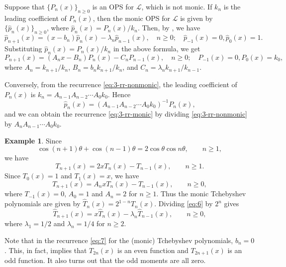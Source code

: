 \documentclass{amsart}
\numberwithin{equation}{section}
\theoremstyle{definition}
\newtheorem{exam}[thm]{Example}
\newcommand\LL{\mathcal{L}}
\begin{document}
Suppose that \( \{ P_n(x) \}_{n\ge 0} \) is an OPS for \( \LL \),
which is not monic. If \( k_n \) is the leading coefficient of
\( P_n(x) \), then the monic OPS for \( \LL \) is given by
\( \{ \hat{p}_n(x) \}_{n\ge 0} \), where
\( \hat{p}_n(x) = P_n(x)/k_n \).
Then, by , we have
\begin{equation}\label{eq:3-rr-monic}
  \hat{p}_{n+1}(x) = (x-b_n) \hat{p}_n(x) - \lambda_n
  \hat{p}_{n-1}(x), \quad n\ge0; \quad \hat{p}_{-1}(x) = 0, \hat{p}_{0}(x) = 1.
\end{equation}
Substituting \( \hat{p}_n(x) = P_n(x)/k_n \) in the above formula, we get
\begin{equation}\label{eq:3-rr-nonmonic}
  P_{n+1}(x) = (A_nx-B_n) P_n(x) - C_n P_{n-1}(x), \quad n\ge0; \quad P_{-1}(x) = 0, P_{0}(x) = k_0,
\end{equation}
where \( A_n = k_{n+1}/k_n \), \( B_n = b_nk_{n+1}/k_n \), and
\( C_n = \lambda_nk_{n+1}/k_{n-1} \).

Conversely, from the recurrence \eqref{eq:3-rr-nonmonic}, the leading
coefficient of \( P_n(x) \) is
\( k_n = A_{n-1}A_{n-2} \cdots A_0 k_0 \). Hence
\[
  \hat{p}_n(x) = (A_{n-1}A_{n-2} \cdots A_0 k_0)^{-1} P_n(x),
\]
and we can obtain the recurrence \eqref{eq:3-rr-monic} by dividing
\eqref{eq:3-rr-nonmonic} by \( A_{n}A_{n-1} \cdots A_0 k_0 \).

\begin{exam}
  Since
  \[
    \cos(n+1)\theta + \cos(n-1)\theta
    = 2 \cos\theta \cos n\theta, \qquad n\ge1,
  \]
  we have
  \[
    T_{n+1}(x) = 2 x T_n(x) - T_{n-1}(x) , \qquad n\ge1.
  \]
  Since \( T_{0}(x)=1 \) and \( T_{1}(x)=x \), we have
  \begin{equation}\label{eq:6}
    T_{n+1}(x) = A_n x T_n(x) - T_{n-1}(x), \qquad n\ge0,
  \end{equation}
  where \( T_{-1}(x) = 0 \), \( A_0=1 \) and \( A_n=2 \) for
  \( n\ge1 \). Thus the monic Tchebyshev polynomials are given by
  \( \hat{T}_n(x) = 2^{1-n} T_n(x) \).
  Dividing \eqref{eq:6} by \( 2^n \) gives
  \begin{equation}\label{eq:7}
    \hat{T}_{n+1}(x) = x \hat{T}_n(x) - \lambda_n\hat{T}_{n-1}(x), \qquad n\ge0,
  \end{equation}
  where \( \lambda_1 = 1/2 \) and \( \lambda_n = 1/4 \) for \( n\ge2 \).
\end{exam}

Note that in the recurrence \eqref{eq:7} for the (monic) Tchebyshev
polynomials, \( b_n = 0 \). This, in fact, implies that
\( T_{2n}(x) \) is an even function and \( T_{2n+1}(x) \) is an odd
function. It also turns out that the odd moments are all zero.
\end{document}
